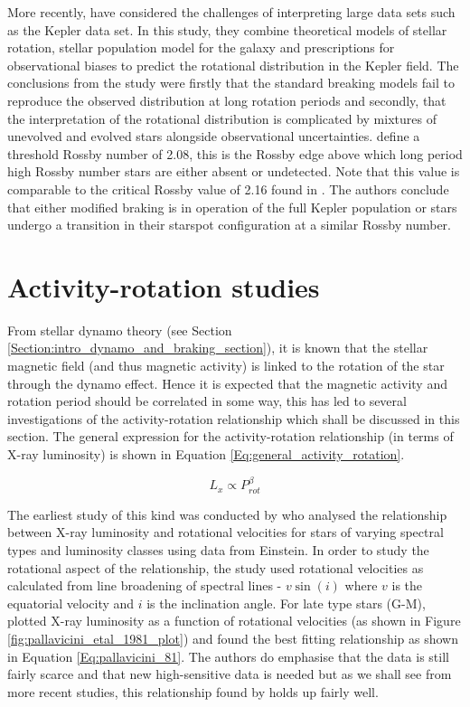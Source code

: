 More recently, \citet{van_Saders_etal_2019} have considered the challenges of interpreting large data sets such as the Kepler data set. In this study, they combine theoretical models of stellar rotation, stellar population model for the galaxy and prescriptions for observational biases to predict the rotational distribution in the Kepler field. The conclusions from the study were firstly that the standard breaking models fail to reproduce the observed distribution at long rotation periods and secondly, that the interpretation of the rotational distribution is complicated by mixtures of unevolved and evolved stars alongside observational uncertainties. \citet{van_Saders_etal_2019} define a threshold Rossby number of 2.08, this is the Rossby edge above which long period high Rossby number stars are either absent or undetected. Note that this value is comparable to the critical Rossby value of 2.16 found in \citet{van_Saders_etal_2016}. The authors conclude that either modified braking is in operation of the full Kepler population or stars undergo a transition in their starspot configuration at a similar Rossby number.

\section{Activity-rotation studies}
\label{Chp2_activity-rotation_lit_review}

From stellar dynamo theory (see Section \ref{Section:intro_dynamo_and_braking_section}), it is known that the stellar magnetic field (and thus magnetic activity) is linked to the rotation of the star through the dynamo effect. Hence it is expected that the magnetic activity and rotation period should be correlated in some way, this has led to several investigations of the activity-rotation relationship which shall be discussed in this section. The general expression for the activity-rotation relationship (in terms of X-ray luminosity) is shown in Equation \ref{Eq:general_activity_rotation}.

\begin{equation}
    L_{x} \propto P_{rot}^{\beta}
    \label{Eq:general_activity_rotation}
\end{equation}

The earliest study of this kind was conducted by \citet{Pallavicini_etal_1981} who analysed the relationship between X-ray luminosity and rotational velocities for stars of varying spectral types and luminosity classes using data from Einstein. In order to study the rotational aspect of the relationship, the study used rotational velocities as calculated from line broadening of spectral lines - $v\sin(i)$ where $v$ is the equatorial velocity and $i$ is the inclination angle. For late type stars (G-M), \citet{Pallavicini_etal_1981} plotted X-ray luminosity as a function of rotational velocities (as shown in Figure \ref{fig:pallavicini_etal_1981_plot}) and found the best fitting relationship as shown in Equation \ref{Eq:pallavicini_81}. The authors do emphasise that the data is still fairly scarce and that new high-sensitive data is needed but as we shall see from more recent studies, this relationship found by \citet{Pallavicini_etal_1981} holds up fairly well.

